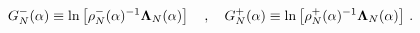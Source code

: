 \begin{equation}
G^-_N(\alpha)\equiv\ln \left [\rho _N^-(\alpha)^{-1}{\bf \Lambda }_N(\alpha)\right ]
\quad , \quad G^+_N(\alpha)\equiv\ln \left [\rho _N^+(\alpha )^{-1}{\bf \Lambda }_N
(\alpha)\right ] \, . \label {FG}
\end{equation} 
